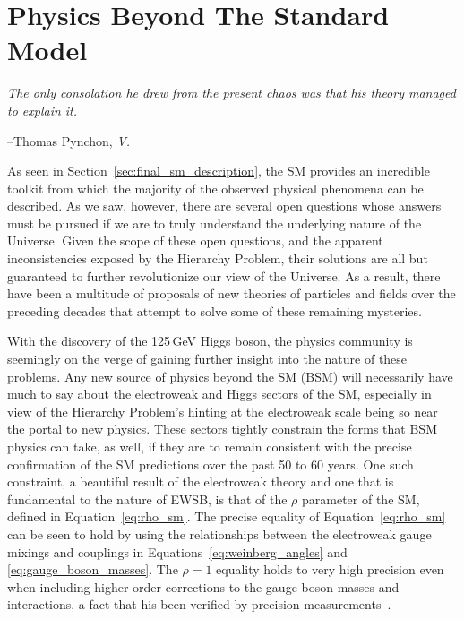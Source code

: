 \chapter{Physics Beyond The Standard Model}
\label{chap:bsm}

\epigraph{\textit{The only consolation he drew from the present chaos was that his theory managed to explain it.}}{--Thomas Pynchon, \textit{V.}}

%
%

As seen in Section~\ref{sec:final_sm_description}, the SM provides an incredible toolkit
from which the majority of the observed physical phenomena can be described.
As we saw, however, there are several open questions whose answers must be pursued
if we are to truly understand the underlying nature of the Universe.
Given the scope of these open questions, and the apparent inconsistencies exposed by the Hierarchy Problem,
their solutions are all but guaranteed to further revolutionize our view of the Universe.
As a result, there have been a multitude of proposals of new theories of particles and fields over the preceding decades that attempt
to solve some of these remaining mysteries.


With the discovery of the 125\,GeV Higgs boson, the physics community is seemingly
on the verge of gaining further insight into the nature of these problems.
Any new source of physics beyond the SM (BSM) will necessarily have much to say
about the electroweak and Higgs sectors of the SM,
especially in view of the Hierarchy Problem's hinting at the electroweak scale
being so near the portal to new physics.
These sectors tightly constrain the forms that BSM physics can take, as well, if they
are to remain consistent with the precise confirmation of the SM predictions
over the past 50 to 60 years.
One such constraint, a beautiful result of the electroweak theory and one that
is fundamental to the nature of EWSB, is that of the $\rho$ parameter of the SM,
defined in Equation~\ref{eq:rho_sm}.
The precise equality of Equation~\ref{eq:rho_sm} can be seen to hold by using the relationships
between the electroweak gauge mixings and couplings in Equations~\ref{eq:weinberg_angles} and \ref{eq:gauge_boson_masses}.
The $\rho = 1$ equality holds to very high precision even when including higher order
corrections to the gauge boson masses and interactions, a fact that his been verified
by precision measurements~\cite{EWSBProbeRho,PDGRef}.

